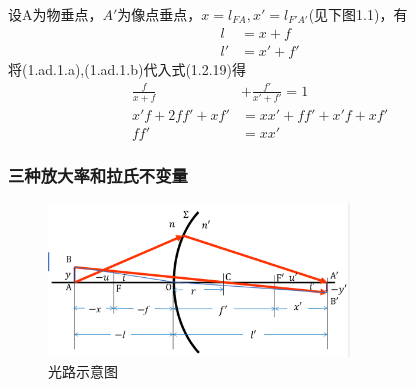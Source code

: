 \begin{description}[leftmargin=0.7cm,style=nextline,nosep]
    \item[牛顿公式]
    设A为物垂点，$A'$为像点垂点，$\displaystyle x=l_{FA},x'=l_{F'A'}$(见下图1.1)，有
  \begin{align}
 l&=x+f \tag{1.ad.1.a} \\
 l'&=x'+f' \tag{1.ad.1.b}
  \end{align}
将(1.ad.1.a),(1.ad.1.b)代入式(1.2.19)得
\begin{align}
    \frac{f}{x+f}&+\frac{f'}{x'+f'}=1 \tag{1.ad.2.bef.1} \\
    x'f+2ff'+xf'&=xx'+ff'+x'f+xf' \tag{1.ad.2.bef.2}\\
    ff'&=xx' \tag{1.ad.2}
\end{align}
\end{description}
\subsubsection{三种放大率和拉氏不变量}
        \begin{figure}[H]
            \centering
            \includegraphics[width=8cm]{img/1.3.png}
            \caption[图1.1]{光路示意图}
            \end{figure}
